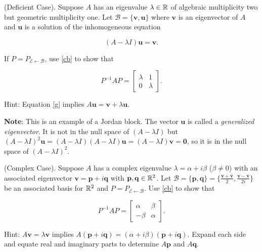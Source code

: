 \documentclass[11pt,letterpaper,boxed]{pset}
\begin{document}
    \begin{problem} [Exercise 6.]
        (Deficient Case). Suppose $A$ has an eigenvalue $\lambda \in \mathbb{R}$ of algebraic multiplicity two but geometric multiplicity one. Let $\mathcal{B} =\{ \mathbf{v},  \mathbf{u} \}$ where $\mathbf{v}$ is an eigenvector of $A$ and $\mathbf{u}$ is a solution of the inhomogeneous equation 
        
        \begin{equation}
            (A - \lambda I) \mathbf{u} = \mathbf{v}.
            \label{g}
        \end{equation}
        
        If  $P = P_{\mathcal{E} \leftarrow \mathcal{B}}$, use \eqref{cb} to show that 
        
        \[ P^{-1} A P = \begin{bmatrix} \lambda &  1 \\ 0 & \lambda \end{bmatrix}.  \]
        
        Hint: Equation \eqref{g} implies $A\mathbf{u} =  \mathbf{v} + \lambda \mathbf{u}$.
        
        \noindent \textbf{Note}: This is an example of a Jordan block. The vector $\mathbf{u}$ is called a \textit{generalized eigenvector}. It is not in the null space of $(A - \lambda I)$ but 
        $(A - \lambda I)^2 \mathbf{u} = 
        (A - \lambda I) (A - \lambda I) \mathbf{u} = (A - \lambda I) \mathbf{v} = \mathbf{0}$, 
        so it is in the null space of  $(A - \lambda I)^2$. 
    \end{problem}
    \newpage
    
    \begin{problem} [Exercise 7] 
    (Complex Case). Suppose $A$ has a complex eigenvalue $\lambda = \alpha +i \beta$ ($\beta \neq 0$) with an associated eigenvector $\mathbf{v} = \mathbf{p} + i \mathbf{q}$ with $\mathbf{p},\mathbf{q} \in \mathbb{R}^2$.  Let $\mathcal{B} = \{ \mathbf{p} ,  \mathbf{q} \} = \{\frac{\mathbf{v} + \bar{\mathbf{v}}}{2}, \frac{\mathbf{v} - \bar{\mathbf{v}}}{2i} \}$  be an associated basis for $\mathbb{R}^2$ and $P = P_{\mathcal{E} \leftarrow \mathcal{B}}$. Use \eqref{cb}  to show that
    
    \[ P^{-1} A P = \begin{bmatrix} \alpha &  \beta \\ -\beta & \alpha \end{bmatrix}.  \]
    
    Hint: $A\mathbf{v} = \lambda \mathbf{v} $ implies $A(\mathbf{p} + i \mathbf{q}) = (\alpha + i \beta) (\mathbf{p} + i\mathbf{q})$. Expand each side and equate real and imaginary parts to determine $A\mathbf{p}$ and $A\mathbf{q}$. 
    \end{problem}
    
\end{document}
